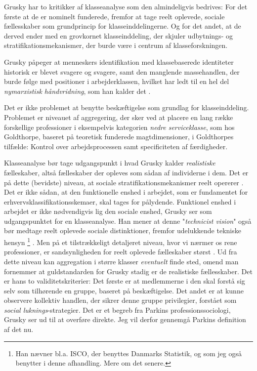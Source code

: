 





Grusky har to kritikker af klasseanalyse som den almindeligvis bedrives: For det første at de er nominelt funderede, fremfor at tage reelt oplevede, sociale fællesskaber som grundprincip for klasseinddelingerne. Og for det andet, at de derved ender med en grovkornet klasseinddeling, der skjuler udbytnings- og stratifikationsmekanismer, der burde være i centrum af klasseforskningen. 

Grusky påpeger at menneskers identifikation med klassebaserede identiteter historisk er blevet svagere og svagere, samt den manglende massehandlen, der burde følge med positioner i arbejderklassen, hvilket har ledt til en hel del \emph{nymarxistisk håndvridning}, som han kalder det \parencite[205]{Grusky2001}.  

Det er ikke problemet at benytte beskæftigelse som grundlag for klasseinddeling. Problemet er niveauet af aggregering, der sker ved at placere en lang række forskellige professioner i eksempelvis kategorien \emph{nedre serviceklasse}, som hos Goldthorpe, baseret på teoretisk funderede magtdimensioner, i Goldthorpes tilfælde: Kontrol over arbejdsprocessen samt specificiteten af færdigheder.  

Klasseanalyse bør tage udgangspunkt i hvad Grusky kalder \emph{realistiske} fælleskaber, altså fælleskaber der opleves som sådan af individerne i dem. Det er på dette (bevidste) niveau, at sociale stratifikationsmekanismer reelt opererer \parencite[212]{Grusky2001}. Det er ikke sådan, at den funktionelle enshed i arbejdet, som er fundamentet for erhvervsklassifikationsskemaer, skal tages for pålydende. Funktionel enshed i arbejdet er ikke nødvendigvis lig den sociale enshed, Grusky ser som udgangspunktet for en klasseanalyse. Han mener at denne "\emph{technicist vision}" %
\label{gruskytechnicistvision}%
også bør medtage reelt oplevede sociale distinktioner, fremfor udelukkende tekniske hensyn \parencite[215]{Grusky2001}%
%
\footnote{Han nævner bl.a. ISCO, der benyttes Danmarks Statistik, og som jeg også benytter i denne afhandling. Mere om det senere.}%
%
. Men på et tilstrækkeligt detaljeret niveau, hvor vi nærmer os rene professioner, er sandsynligheden for reelt oplevede fælleskaber størst \parencite[207]{Grusky2001}. Ud fra dette niveau kan aggregation i større klasser \emph{eventuelt} finde sted, omend man fornemmer at guldstandarden for Grusky stadig er de realistiske fællesskaber. Det er hans to validitetskriterier: Det første er at medlemmerne i den skal forstå sig selv som tilhørende en gruppe, baseret på beskæftigelse. Det andet er at kunne observere kollektiv handlen, der sikrer denne gruppe privilegier, forstået som \emph{social luknings}-strategier.  Det er et begreb fra Parkins professionssociologi, Grusky ser ud til at overføre direkte. Jeg vil derfor gennemgå Parkins definition af det nu.







